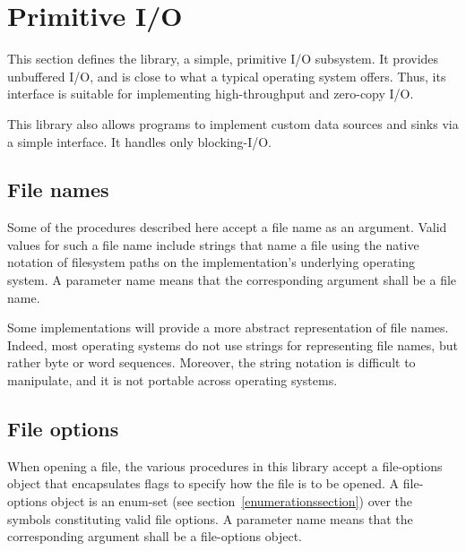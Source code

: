 \section{Primitive I/O}
\label{primiosection}

This section defines the  library, a
simple, primitive I/O subsystem.  It provides unbuffered I/O, and is
close to what a typical operating system offers. Thus, its interface
is suitable for implementing high-throughput and zero-copy I/O.

This library also allows programs to implement custom data
sources and sinks via a simple interface.
It handles only blocking-I/O.

\subsection{File names}

Some of the procedures described here accept a file name as an
argument. Valid values for such a file name include strings that name a file
using the native notation of filesystem paths on the implementation's underlying
operating system.
A  parameter name means that the
corresponding argument shall be a file name.

Some implementations will provide a more
abstract representation of file names. Indeed, most operating
systems do not use strings for representing file names, but rather byte
or word sequences. Moreover, the string notation is difficult to manipulate, and
it is not portable across operating systems.

\subsection{File options}
\label{fileoptionssection}

When opening a file, the various procedures in this library accept a
{\cf file-options} object that encapsulates flags to specify how
the file is to be opened. A {\cf file-options} object is an enum-set
(see section~\ref{enumerationssection}) over the symbols constituting
valid file options.
A  parameter name means that the
corresponding argument shall be a file-options object.

